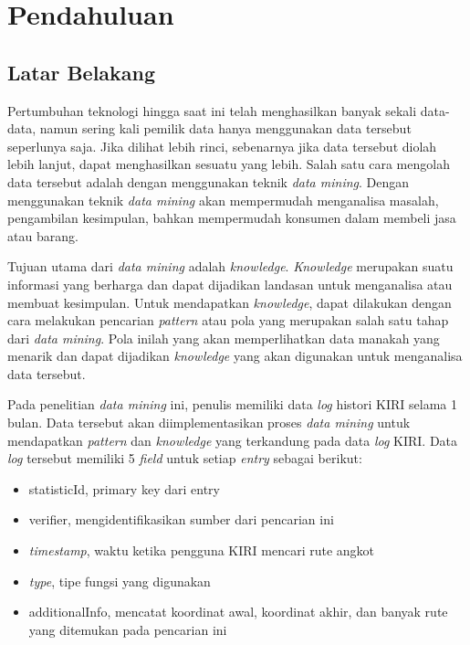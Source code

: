 \chapter{Pendahuluan}
\label{chap:intro}

\section{Latar Belakang}
\label{sec:motivation}

Pertumbuhan teknologi hingga saat ini telah menghasilkan banyak sekali data-data, namun sering kali pemilik data hanya menggunakan data tersebut seperlunya saja. Jika dilihat lebih rinci, sebenarnya jika data tersebut diolah lebih lanjut, dapat menghasilkan sesuatu yang lebih. Salah satu cara mengolah data tersebut adalah dengan menggunakan teknik \textsl{data mining}. Dengan menggunakan teknik \textsl{data mining} akan mempermudah menganalisa masalah, pengambilan kesimpulan, bahkan mempermudah konsumen dalam membeli jasa atau barang.

Tujuan utama dari \textsl{data mining} adalah \textsl{knowledge}. \textsl{Knowledge} merupakan suatu informasi yang berharga dan dapat dijadikan landasan untuk menganalisa atau membuat kesimpulan. Untuk mendapatkan \textsl{knowledge}, dapat dilakukan dengan cara melakukan pencarian \textsl{pattern} atau pola yang merupakan salah satu tahap dari \textsl{data mining}. Pola inilah yang akan memperlihatkan data manakah yang menarik dan dapat dijadikan \textsl{knowledge} yang akan digunakan untuk menganalisa data tersebut.

Pada penelitian \textsl{data mining} ini, penulis memiliki data \textsl{log} histori KIRI selama 1 bulan. Data tersebut akan diimplementasikan proses \textsl{data mining} untuk mendapatkan \textsl{pattern} dan \textsl{knowledge} yang terkandung pada data \textsl{log} KIRI. Data \textsl{log} tersebut memiliki 5 \textsl{field} untuk setiap \textsl{entry} sebagai berikut:
\begin{itemize}
	\item statisticId, primary key dari entry
	\item verifier, mengidentifikasikan sumber dari pencarian ini
	\item \textsl{timestamp}, waktu ketika pengguna KIRI mencari rute angkot
	\item \textsl{type}, tipe fungsi yang digunakan
	\item additionalInfo, mencatat koordinat awal, koordinat akhir, dan banyak rute yang ditemukan pada pencarian ini
\end{itemize}
  
